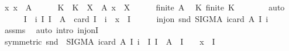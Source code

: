 \begin{isabellebody}
\ x{\isacharcolon}{\kern0pt}\ {\isachardoublequoteopen}x\ {\isasymin}\ {\isasymUnion}A{\isachardoublequoteclose}\isanewline
\ \ \ \ \isamarkupfalse%
\ K\ \ {\isachardoublequoteopen}K\ {\isacharequal}{\kern0pt}\ {\isacharbraceleft}{\kern0pt}X\ {\isasymin}\ A{\isachardot}{\kern0pt}\ x\ {\isasymin}\ X{\isacharbraceright}{\kern0pt}{\isachardoublequoteclose}\isanewline
\ \ \ \ \isamarkupfalse%
\ {\isacartoucheopen}finite\ A{\isacartoucheclose}\ \isamarkupfalse%
\ K{\isacharcolon}{\kern0pt}\ {\isachardoublequoteopen}finite\ K{\isachardoublequoteclose}\isanewline
\ \ \ \ \ \ \isamarkupfalse%
\ auto\isanewline
\ \ \ \ \isamarkupfalse%
\ {\isacharquery}{\kern0pt}I\ {\isacharequal}{\kern0pt}\ {\isachardoublequoteopen}{\isasymlambda}i{\isachardot}{\kern0pt}\ {\isacharbraceleft}{\kern0pt}I{\isachardot}{\kern0pt}\ I\ {\isasymsubseteq}\ A\ {\isasymand}\ card\ I\ {\isacharequal}{\kern0pt}\ i\ {\isasymand}\ x\ {\isasymin}\ {\isasymInter}I{\isacharbraceright}{\kern0pt}{\isachardoublequoteclose}\isanewline
\ \ \ \ \isamarkupfalse%
\ {\isachardoublequoteopen}inj{\isacharunderscore}{\kern0pt}on\ snd\ {\isacharparenleft}{\kern0pt}SIGMA\ i{\isacharcolon}{\kern0pt}{\isacharbraceleft}{\kern0pt}{}{\isachardot}{\kern0pt}{\isachardot}{\kern0pt}card\ A{\isacharbraceright}{\kern0pt}{\isachardot}{\kern0pt}\ {\isacharquery}{\kern0pt}I\ i{\isacharparenright}{\kern0pt}{\isachardoublequoteclose}\isanewline
\ \ \ \ \ \ \isamarkupfalse%
\ assms\ \isamarkupfalse%
\ {\isacharparenleft}{\kern0pt}auto\ intro{\isacharbang}{\kern0pt}{\isacharcolon}{\kern0pt}\ inj{\isacharunderscore}{\kern0pt}onI{\isacharparenright}{\kern0pt}\isanewline
\ \ \ \ \isamarkupfalse%
\ \isamarkupfalse%
\ {\isacharbrackleft}{\kern0pt}symmetric{\isacharbrackright}{\kern0pt}{\isacharcolon}{\kern0pt}\ {\isachardoublequoteopen}snd\ {\isacharbackquote}{\kern0pt}\ {\isacharparenleft}{\kern0pt}SIGMA\ i{\isacharcolon}{\kern0pt}{\isacharbraceleft}{\kern0pt}{}{\isachardot}{\kern0pt}{\isachardot}{\kern0pt}card\ A{\isacharbraceright}{\kern0pt}{\isachardot}{\kern0pt}\ {\isacharquery}{\kern0pt}I\ i{\isacharparenright}{\kern0pt}\ {\isacharequal}{\kern0pt}\ {\isacharbraceleft}{\kern0pt}I{\isachardot}{\kern0pt}\ I\ {\isasymsubseteq}\ A\ {\isasymand}\ I\ {\isasymnoteq}\ {\isacharbraceleft}{\kern0pt}{\isacharbraceright}{\kern0pt}\ {\isasymand}\ x\ {\isasymin}\ {\isasymInter}I{\isacharbraceright}{\kern0pt}{\isachardoublequoteclose}\isanewline

\end{isabellebody}
